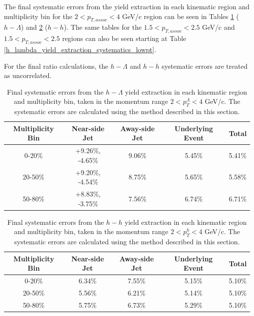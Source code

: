 \documentclass[ALICE,manyauthors]{ALICE_analysis_notes}
\begin{document}
The final systematic errors from the yield extraction in each kinematic region and multiplicity bin for the  $2 < p_{T, assoc} < 4$ GeV/c region can be seen in Tables \ref{h_lambda_yield_extraction_systematics} ($h-\Lambda$) and \ref{h_h_yield_extraction_systematics} ($h-h$). The same tables for the  $1.5 < p_{T, assoc} < 2.5$ GeV/c and  $1.5 < p_{T, assoc} < 2.5$ regions can also be seen starting at Table \ref{h_lambda_yield_extraction_systematics_lowpt}. 

For the final ratio calculations, the $h-\Lambda$ and $h-h$ systematic errors are treated as uncorrelated.

\begin{table}[h!]
\centering
\begin{tabular}{| c | c | c | c | c | }
\hline
Multiplicity Bin & Near-side Jet & Away-side Jet & Underlying Event & Total  \\
\hline
0-20\% & +9.26\%, -4.65\% & 9.06\%  & 5.45\% & 5.41\% \\
20-50\% & +9.20\%, -4.54\%  & 8.75\%  & 5.65\% & 5.58\% \\
50-80\% & +8.83\%, -3.75\%  & 7.56\%  & 6.74\% & 6.71\% \\
\hline
\end{tabular}
\caption{Final systematic errors from the $h-\Lambda$ yield extraction in each kinematic region and multiplicity bin, taken in the momentum range $2 < p_{T}^{\Lambda} < 4$ GeV/c. The systematic errors are calculated using the method described in this section.}
\label{h_lambda_yield_extraction_systematics}
\end{table}

\begin{table}[h!]
\centering
\begin{tabular}{| c | c | c | c | c | }
\hline
Multiplicity Bin & Near-side Jet & Away-side Jet & Underlying Event & Total  \\
\hline
0-20\% & 6.34\%   & 7.55\%  & 5.15\% & 5.10\% \\
20-50\% & 5.56\% & 6.21\%  & 5.14\% & 5.10\% \\
50-80\% & 5.75\% & 6.73\%  & 5.29\% & 5.10\% \\
\hline
\end{tabular}
\caption{Final systematic errors from the $h-h$ yield extraction in each kinematic region and multiplicity bin, taken in the momentum range $2 < p_{T}^{h} < 4$ GeV/c. The systematic errors are calculated using the method described in this section.}
\label{h_h_yield_extraction_systematics}
\end{table}
\end{document}
